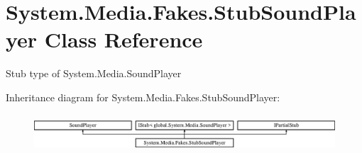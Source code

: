 \hypertarget{class_system_1_1_media_1_1_fakes_1_1_stub_sound_player}{\section{System.\-Media.\-Fakes.\-Stub\-Sound\-Player Class Reference}
\label{class_system_1_1_media_1_1_fakes_1_1_stub_sound_player}
}


Stub type of System.\-Media.\-Sound\-Player 


Inheritance diagram for System.\-Media.\-Fakes.\-Stub\-Sound\-Player\-:\begin{figure}[H]
\begin{center}
\leavevmode
\includegraphics[height=1.403509cm]{class_system_1_1_media_1_1_fakes_1_1_stub_sound_player}
\end{center}
\end{figure}
